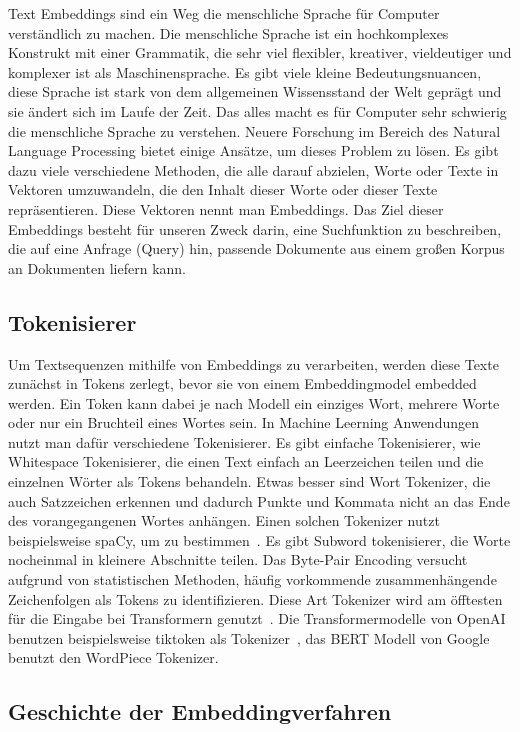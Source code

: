 Text Embeddings sind ein Weg die menschliche Sprache für Computer verständlich zu machen. 
Die menschliche Sprache ist ein hochkomplexes Konstrukt mit einer Grammatik, die sehr viel flexibler, kreativer, vieldeutiger und komplexer ist als Maschinensprache. 
Es gibt viele kleine Bedeutungsnuancen, diese Sprache ist stark von dem allgemeinen Wissensstand der Welt geprägt und sie ändert sich im Laufe der Zeit. 
Das alles macht es für Computer sehr schwierig die menschliche Sprache zu verstehen. 
Neuere Forschung im Bereich des Natural Language Processing bietet einige Ansätze, um dieses Problem zu lösen. 
Es gibt dazu viele verschiedene Methoden, die alle darauf abzielen, Worte oder Texte in Vektoren umzuwandeln, die den Inhalt dieser Worte oder dieser Texte repräsentieren.
Diese Vektoren nennt man Embeddings.
Das Ziel dieser Embeddings besteht für unseren Zweck darin, eine Suchfunktion zu beschreiben, die auf eine Anfrage (Query) hin, passende Dokumente aus einem großen Korpus an Dokumenten liefern kann.

\subsection{Tokenisierer}

Um Textsequenzen mithilfe von Embeddings zu verarbeiten, werden diese Texte zunächst in Tokens zerlegt, bevor sie von einem Embeddingmodel embedded werden.  
Ein Token kann dabei je nach Modell ein einziges Wort, mehrere Worte oder nur ein Bruchteil eines Wortes sein.
In Machine Leerning Anwendungen nutzt man dafür verschiedene Tokenisierer.
Es gibt einfache Tokenisierer, wie Whitespace Tokenisierer, die einen Text einfach an Leerzeichen teilen und die einzelnen Wörter als Tokens behandeln.
Etwas besser sind Wort Tokenizer, die auch Satzzeichen erkennen und dadurch Punkte und Kommata nicht an das Ende des vorangegangenen Wortes anhängen. 
Einen solchen Tokenizer nutzt beispielsweise spaCy, um  zu bestimmen~\cite{honnibal2017}.
Es gibt Subword tokenisierer, die Worte nocheinmal in kleinere Abschnitte teilen.
Das Byte-Pair Encoding versucht aufgrund von statistischen Methoden, häufig vorkommende zusammenhängende Zeichenfolgen als Tokens zu identifizieren.
Diese Art Tokenizer wird am öfftesten für die Eingabe bei Transformern genutzt~\cite{zouhar2023}.
Die Transformermodelle von OpenAI benutzen beispielsweise tiktoken als Tokenizer~\cite{tiktoken2024}, das BERT Modell von Google benutzt den WordPiece Tokenizer.

\subsection{Geschichte der Embeddingverfahren}

